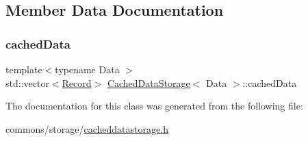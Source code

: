 \subsection{Member Data Documentation}
\mbox{\label{class_cached_data_storage_a0cf3c47cb1543564d958cc27a078b411}} 
\subsubsection{\texorpdfstring{cachedData}{cachedData}}
{\footnotesize\ttfamily template$<$typename Data $>$ \\
std\+::vector$<$\mbox{\hyperlink{struct_cached_data_storage_1_1_record}{Record}}$>$ \mbox{\hyperlink{class_cached_data_storage}{Cached\+Data\+Storage}}$<$ Data $>$\+::cached\+Data\hspace{0.3cm}{\ttfamily [protected]}}



The documentation for this class was generated from the following file\+:\begin{DoxyCompactItemize}
\item 
commons/storage/\mbox{\hyperlink{cacheddatastorage_8h}{cacheddatastorage.\+h}}\end{DoxyCompactItemize}
